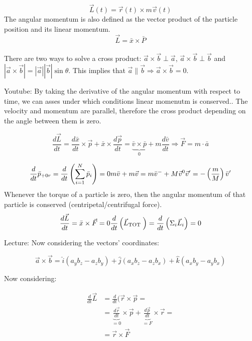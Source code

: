   $$\vec{L}(t) = \vec{r}(t)\times m \vec{v}(t)$$
 The angular momentum is also defined as the vector product of the particle position and its linear momentum. 
 $$\vec{L}=\bar{x} \times \bar{P}$$ \\
  There are two ways to solve a cross product: $\vec{a}\times \vec{b}\perp \vec{a}$, $\vec{a}\times \vec{b}\perp \vec{b}$ and $|\vec{a}\times \vec{b}| = |\vec{a}||\vec{b}|\sin\theta$.
  This implies that $\vec{a}\parallel \vec{b}\Rightarrow \vec{a}\times \vec{b} = 0$.
  
  Youtube:
  By taking the derivative of the angular momentum with respect to time, we can asses under which conditions linear momenutm is conserved.. The velocity and momentum are parallel, therefore the cross product depending on the angle between them is zero. 
  
  $$\frac{d \vec{L}}{d t}=\frac{d \bar{x}}{d t} \times \vec{p}+\bar{x} \times \frac{d \vec{p}}{d t}=\underbrace{\bar{v} \times \bar{p}}_{0}+m \frac{d \bar{v}}{d t} \Rightarrow \vec{F}=m \cdot \bar{a}$$

$$
\frac{d}{d t} \bar{p}_{+0 r}=\frac{d}{d t}\left(\sum_{i=1}^{N} \bar{p}_{i}\right)=0 \\
m \bar{v}+m \vec{v}=m \bar{v}^{-}+M \vec{v}^{0} \\
\vec{v}^{\prime}=-\left(\frac{m}{M}\right) \bar{v}^{\prime}$$
Whenever the torque of a particle is zero, then the angular momentum of that particle is conserved (centripetal/centrifugal force).
$$\frac{d \vec{L}}{d t}=\bar{x} \times \vec{F}=0 \\
\frac{d}{d t}\left(\vec{L}_{\text {TOT }}\right)=\frac{d}{d t}\left(\Sigma_{i} \vec{L}_{i}\right)=0 \\
$$
  
  Lecture:
  Now considering the vectors' coordinates:

  $$\vec{a}\times \vec{b} = \hat{i}(a_yb_z - a_zb_y) + \hat{j}(a_xb_z - a_zb_x) + \hat{k}(a_xb_y-a_yb_x)$$

  Now considering:

  \begin{align*}
    \frac{d{}}{d{t}}\vec{L} &= \frac{d{}}{d{t}}(\vec{r}\times \vec{p}=\\
                            &=\underbrace{\frac{d{\vec{r}}}{d{t}}}_{=0}\times\vec{p} + \underbrace{\frac{d{\vec{p}}}{d{t}}}_{=F}\times\vec{r} =\\
                            &= \vec{r}\times \vec{F}
  \end{align*}

